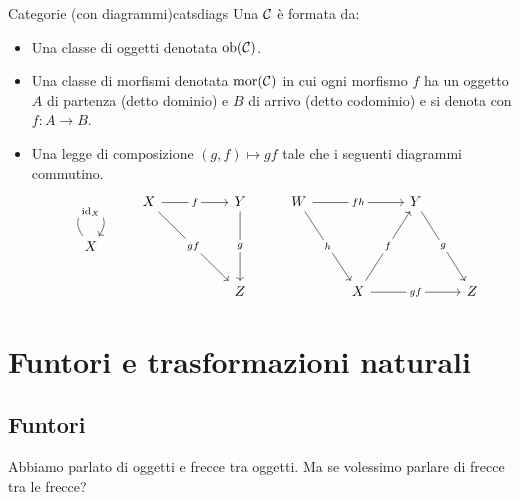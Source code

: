 \documentclass{article}
\begin{document}
\begin{definition}{Categorie (con diagrammi)}{catsdiags}
    Una  $\mathcal{C}$ è formata da:
    \begin{itemize}
        \item Una classe di oggetti denotata $\operatorname{ob}(\mathcal{C})$.
        \item Una classe di morfismi denotata $\operatorname{mor}(\mathcal{C})$ in cui ogni morfismo $f$ ha un oggetto $A$ di partenza (detto dominio) e $B$ di arrivo (detto codominio) e si denota con $f:A\to B$.
        \item Una legge di composizione $(g,f)\mapsto gf$ tale che i seguenti diagrammi commutino.
        \[\begin{tikzcd}
            & X && Y & W && Y \\
            X \\
            &&& Z && X && Z
            \arrow["f"{description}, from=1-2, to=1-4]
            \arrow["gf"{description}, from=1-2, to=3-4]
            \arrow["g"{description}, from=1-4, to=3-4]
            \arrow["fh"{description}, from=1-5, to=1-7]
            \arrow["h"{description}, from=1-5, to=3-6]
            \arrow["g"{description}, from=1-7, to=3-8]
            \arrow["{\id{X}}"{description}, from=2-1, to=2-1, loop, in=55, out=125, distance=10mm]
            \arrow["f"{description}, from=3-6, to=1-7]
            \arrow["gf"{description}, from=3-6, to=3-8]
        \end{tikzcd}\]
    \end{itemize}
\end{definition}

\section{Funtori e trasformazioni naturali}
\label{Sec:Functors}

\subsection{Funtori}

Abbiamo parlato di oggetti e frecce tra oggetti. Ma se volessimo parlare di frecce tra le frecce?
\end{document}
